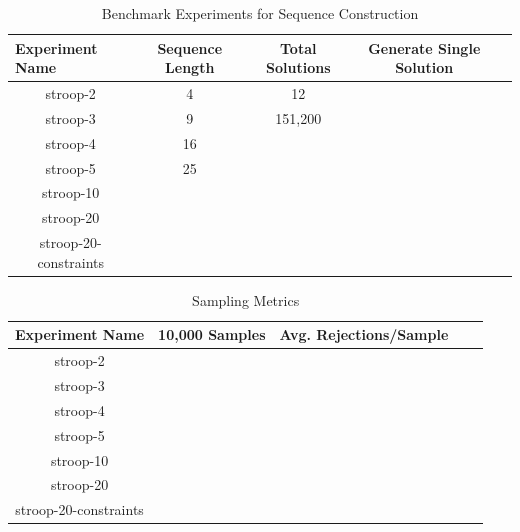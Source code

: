 \begin{table}[t]
  \centering
  \caption{Benchmark Experiments for Sequence Construction}
\begin{tabular}{|c|c|c|c|c|}
\hline
\multicolumn{1}{|l|}{Experiment Name} & Sequence Length & Total Solutions & Generate Single Solution  \\ \hline
stroop-2                              & 4               & 12              &                           \\ \hline
stroop-3                              & 9               & 151,200         &                           \\ \hline
stroop-4                              & 16              &                 &                           \\ \hline
stroop-5                              & 25              &                 &                           \\ \hline
stroop-10                             &                 &                 &                           \\ \hline
stroop-20                             &                 &                 &                           \\ \hline
stroop-20-constraints                 &                 &                 &                           \\ \hline
\end{tabular}
\label{tab:benchmark_experiments_construction}
\end{table}

\begin{table}[t]
  \centering
  \caption{Sampling Metrics}
\begin{tabular}{|c|c|c|c|c|}
\hline
\multicolumn{1}{|l|}{Experiment Name} & 10,000 Samples & Avg. Rejections/Sample  \\ \hline
stroop-2                              &                &                         \\ \hline
stroop-3                              &                &                         \\ \hline
stroop-4                              &                &                         \\ \hline
stroop-5                              &                &                         \\ \hline
stroop-10                             &                &                         \\ \hline
stroop-20                             &                &                         \\ \hline
stroop-20-constraints                 &                &                         \\ \hline
\end{tabular}
\label{tab:sampling_metrics}
\end{table}

